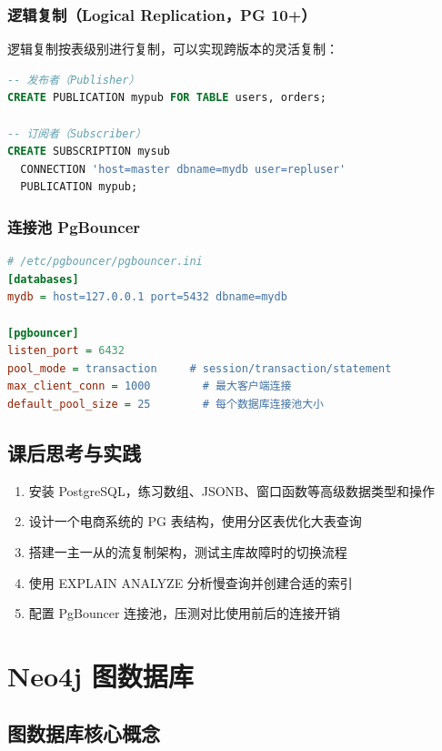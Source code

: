 \documentclass[12pt,UTF8]{ctexbook}
\begin{document}
\subsection*{逻辑复制（Logical Replication，PG 10+）}
逻辑复制按表级别进行复制，可以实现跨版本的灵活复制：
\begin{lstlisting}[language=sql]
-- 发布者（Publisher）
CREATE PUBLICATION mypub FOR TABLE users, orders;

-- 订阅者（Subscriber）
CREATE SUBSCRIPTION mysub 
  CONNECTION 'host=master dbname=mydb user=repluser'
  PUBLICATION mypub;
\end{lstlisting}

\subsection*{连接池 PgBouncer}

\begin{lstlisting}[language=ini]
# /etc/pgbouncer/pgbouncer.ini
[databases]
mydb = host=127.0.0.1 port=5432 dbname=mydb

[pgbouncer]
listen_port = 6432
pool_mode = transaction     # session/transaction/statement
max_client_conn = 1000        # 最大客户端连接
default_pool_size = 25        # 每个数据库连接池大小
\end{lstlisting}

\section{课后思考与实践}
\label{sec:postgresql-practice}
\begin{enumerate}
    \item 安装 PostgreSQL，练习数组、JSONB、窗口函数等高级数据类型和操作
    \item 设计一个电商系统的 PG 表结构，使用分区表优化大表查询
    \item 搭建一主一从的流复制架构，测试主库故障时的切换流程
    \item 使用 EXPLAIN ANALYZE 分析慢查询并创建合适的索引
    \item 配置 PgBouncer 连接池，压测对比使用前后的连接开销
\end{enumerate}

\chapter{Neo4j 图数据库}
\label{chap:neo4j}

\section{图数据库核心概念}
\label{sec:neo4j-core}
\end{document}
